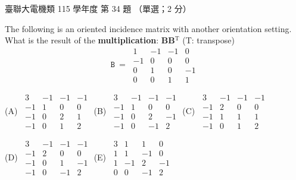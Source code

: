 \begin{pastexam}[label={px:ust-115-ee-ds-34}]{臺聯大電機類 115 學年度 第 34 題}
（單選；2 分）

The following is an oriented incidence matrix with another orientation setting. What is the result
of the \textbf{multiplication}: \textbf{BB$^{\mathrm{T}}$} (T: transpose)
\[ \mathtt{B}\ =\ \begin{matrix}1&-1&-1&0\\-1&0&0&0\\0&1&0&-1\\0&0&1&1\end{matrix} \]

(A)~$\begin{matrix}3&-1&-1&-1\\-1&1&0&0\\-1&0&2&1\\-1&0&1&2\end{matrix}$\qquad
(B)~$\begin{matrix}3&-1&-1&-1\\-1&1&0&0\\-1&0&2&-1\\-1&0&-1&2\end{matrix}$\qquad
(C)~$\begin{matrix}3&-1&-1&-1\\-1&2&0&0\\-1&1&1&1\\-1&0&1&2\end{matrix}$

\medskip
(D)~$\begin{matrix}3&-1&-1&-1\\-1&2&0&0\\-1&0&1&-1\\-1&0&-1&2\end{matrix}$\qquad
(E)~$\begin{matrix}3&1&1&0\\1&1&-1&0\\1&-1&2&-1\\0&0&-1&2\end{matrix}$
\end{pastexam}

